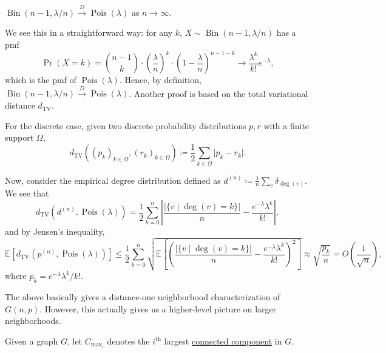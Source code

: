\begin{claim}
	\(\operatorname{Bin}(n-1, \lambda / n) \overset{D}{\to} \operatorname{Pois}(\lambda ) \) as \(n \to \infty \).
\end{claim}
\begin{explanation}
	We see this in a straightforward way: for any \(k\), \(X \sim \operatorname{Bin}(n-1, \lambda / n) \) has a pmf
	\[
		\Pr_{}(X = k)
		= \binom{n-1}{k} \cdot \left( \frac{\lambda}{n} \right) ^{k} \cdot \left( 1 - \frac{\lambda}{n} \right) ^{n-1-k}
		\to \frac{\lambda ^k}{k!} e^{-\lambda },
	\]
	which is the pmf of \(\operatorname{Pois}(\lambda ) \). Hence, by definition, \(\operatorname{Bin}(n - 1, \lambda / n) \overset{D}{\to} \operatorname{Pois}(\lambda ) \). Another proof is based on the total variational distance \(d_{\mathrm{TV} }\).

	\begin{prev}
		For the discrete case, given two discrete probability distributions \(p, r\) with a finite support \(\Omega \),
		\[
			d_{\mathrm{TV} }((p_k)_{k \in \Omega }, (r_k)_{k \in \Omega })
			\coloneqq \frac{1}{2} \sum_{k \in \Omega } \lvert p_k - r_k \rvert.
		\]
	\end{prev}

	Now, consider the empirical degree distribution defined as \(d^{(n)} \coloneqq \frac{1}{n} \sum_{v} \delta _{\deg(v)}\). We see that
	\[
		d_{\mathrm{TV} } \left( d^{(n)} , \operatorname{Pois}(\lambda ) \right)
		= \frac{1}{2} \sum_{k=0}^{n} \left\lvert \frac{\lvert \{ v \mid \deg(v) = k \}  \rvert }{n} - \frac{e^{-\lambda } \lambda ^k}{k!} \right\rvert ,
	\]
	and by Jensen's inequality,
	\[
		\mathbb{E}_{}\left[d_{\mathrm{TV} } \left( p^{(n)} , \operatorname{Pois}(\lambda ) \right) \right]
		\leq \frac{1}{2} \sum_{k=0}^{n} \sqrt{ \mathbb{E}_{}\left[ \left( \frac{\lvert \{ v \mid \deg(v) = k \}  \rvert }{n} - \frac{e^{-\lambda } \lambda ^k}{k!} \right) ^2 \right] }
		\approx \sqrt{\frac{p_k}{n}}
		= O\left( \frac{1}{\sqrt{n} } \right) ,
	\]
	where \(p_k = e^{-\lambda } \lambda ^k / k!\).
\end{explanation}

The above basically gives a distance-one neighborhood characterization of \(G(n, p)\). However, this actually gives us a higher-level picture on larger neighborhoods.

\begin{notation}
	Given a graph \(G\), let \(C_{\max _i}\) denotes the \(i^{\text{th} }\) largest \hyperref[def:connected-component]{connected component} in \(G\).
\end{notation}

